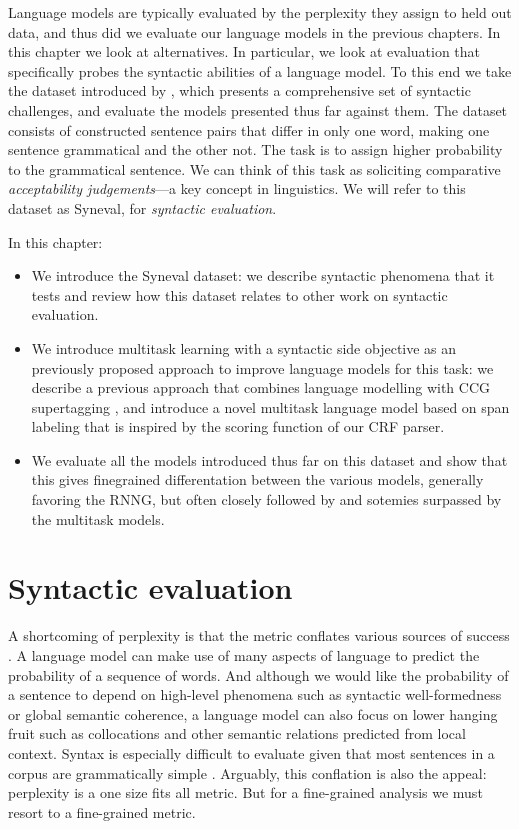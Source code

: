 Language models are typically evaluated by the perplexity they assign to held out data, and thus did we evaluate our language models in the previous chapters. In this chapter we look at alternatives. In particular, we look at evaluation that specifically probes the syntactic abilities of a language model. To this end we take the dataset introduced by \citet{linzen2018targeted}, which presents a comprehensive set of syntactic challenges, and evaluate the models presented thus far against them. The dataset consists of constructed sentence pairs that differ in only one word, making one sentence grammatical and the other not. The task is to assign higher probability to the grammatical sentence. We can think of this task as soliciting comparative \textit{acceptability judgements}---a key concept in linguistics. We will refer to this dataset as Syneval, for \textit{syntactic evaluation}.

In this chapter:
\begin{itemize}
  \item We introduce the Syneval dataset: we describe syntactic phenomena that it tests and review how this dataset relates to other work on syntactic evaluation.
  \item We introduce multitask learning with a syntactic side objective as an previously proposed approach to improve language models for this task: we describe a previous approach that combines language modelling with CCG supertagging \citep{enguehard2017multitask}, and introduce a novel multitask language model based on span labeling that is inspired by the scoring function of our CRF parser.
  \item We evaluate all the models introduced thus far on this dataset and show that this gives finegrained differentation between the various models, generally favoring the RNNG, but often closely followed by and sotemies surpassed by the multitask models.
\end{itemize}

\section{Syntactic evaluation}
  A shortcoming of perplexity is that the metric conflates various sources of success \citep{linzen2018targeted}. A language model can make use of many aspects of language to predict the probability of a sequence of words. And although we would like the probability of a sentence to depend on high-level phenomena such as syntactic well-formedness or global semantic coherence, a language model can also focus on lower hanging fruit such as collocations and other semantic relations predicted from local context. Syntax is especially difficult to evaluate given that most sentences in a corpus are grammatically simple \citep{linzen2018targeted}. Arguably, this conflation is also the appeal: perplexity is a one size fits all metric. But for a fine-grained analysis we must resort to a fine-grained metric.

